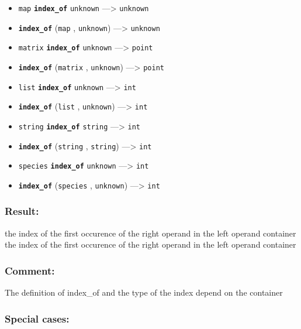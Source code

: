 \documentclass[]{book}
\providecommand{\tightlist}{%
  \setlength{\itemsep}{0pt}\setlength{\parskip}{0pt}}
\theoremstyle{definition}
\theoremstyle{definition}
\theoremstyle{definition}
\theoremstyle{remark}
\begin{document}
\begin{itemize}
\tightlist
\item
  \texttt{map} \textbf{\texttt{index\_of}} \texttt{unknown}
  ---\textgreater{} \texttt{unknown}
\item
  \textbf{\texttt{index\_of}} (\texttt{map} , \texttt{unknown})
  ---\textgreater{} \texttt{unknown}
\item
  \texttt{matrix} \textbf{\texttt{index\_of}} \texttt{unknown}
  ---\textgreater{} \texttt{point}
\item
  \textbf{\texttt{index\_of}} (\texttt{matrix} , \texttt{unknown})
  ---\textgreater{} \texttt{point}
\item
  \texttt{list} \textbf{\texttt{index\_of}} \texttt{unknown}
  ---\textgreater{} \texttt{int}
\item
  \textbf{\texttt{index\_of}} (\texttt{list} , \texttt{unknown})
  ---\textgreater{} \texttt{int}
\item
  \texttt{string} \textbf{\texttt{index\_of}} \texttt{string}
  ---\textgreater{} \texttt{int}
\item
  \textbf{\texttt{index\_of}} (\texttt{string} , \texttt{string})
  ---\textgreater{} \texttt{int}
\item
  \texttt{species} \textbf{\texttt{index\_of}} \texttt{unknown}
  ---\textgreater{} \texttt{int}
\item
  \textbf{\texttt{index\_of}} (\texttt{species} , \texttt{unknown})
  ---\textgreater{} \texttt{int}
\end{itemize}

\subsubsection{Result:}\label{result-264}

the index of the first occurence of the right operand in the left
operand container the index of the first occurence of the right operand
in the left operand container

\subsubsection{Comment:}\label{comment-52}

The definition of index\_of and the type of the index depend on the
container

\subsubsection{Special cases:}\label{special-cases-79}
\end{document}
